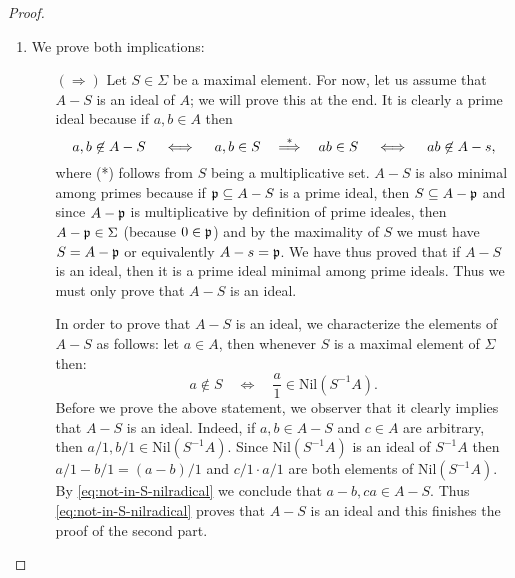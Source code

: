 \begin{proof}
\begin{enumerate}
	 \item We prove both implications:
	\begin{itemize}		
	\item[$(\Longrightarrow)$] Let $S\in\Sigma$ be a maximal element. For now, let us assume that $A-S$ is an ideal of $A$; we will prove this at the end. It is clearly a prime ideal because if $a,b\in A$ then
	\[
		a,b\not\in A-S\quad\iff\quad a,b\in S \quad\overset{*}{\Longrightarrow}\quad ab\in S\quad\iff\quad ab\not\in A-s,
	\]
	where (*) follows from $S$ being a multiplicative set. $A-S$ is also minimal among primes because if $\mathfrak{p}\subseteq A-S$ is a prime ideal, then $S\subseteq A-\mathfrak{p}$ and since $A-\mathfrak{p}$ is multiplicative by definition of prime ideales, then $A-\mathfrak{p}\in\Sigma$ (because $0\in\mathfrak{p}$) and by the maximality of $S$ we must have $S=A-\mathfrak{p}$ or equivalently $A-s=\mathfrak{p}$. We have thus proved that if $A-S$ is an ideal, then it is a prime ideal minimal among prime ideals. Thus we must only prove that $A-S$ is an ideal.
	
	In order to prove that $A-S$ is an ideal, we characterize the elements of $A-S$ as follows: let $a\in A$, then whenever $S$ is a maximal element of $\Sigma$ then:
	\begin{equation}\label{eq:not-in-S-nilradical}
		a\not\in S \quad\Longleftrightarrow\quad \frac{a}{1}\in\mathrm{Nil}(S^{-1}A).
	\end{equation}
	Before we prove the above statement, we observer that it clearly implies that $A-S$ is an ideal. Indeed, if $a,b\in A-S$ and $c\in A$ are arbitrary, then $a/1,b/1\in \mathrm{Nil}(S^{-1}A)$. Since $\mathrm{Nil}(S^{-1}A)$ is an ideal of $S^{-1}A$ then $a/1-b/1=(a-b)/1$ and $c/1\cdot a/1$ are both elements of $\mathrm{Nil}(S^{-1}A)$. By \eqref{eq:not-in-S-nilradical} we conclude that $a-b,ca\in A-S$.	Thus \eqref{eq:not-in-S-nilradical} proves that $A-S$ is an ideal and this finishes the proof of the second part.
	

\end{itemize}
\end{enumerate}
\end{proof}
